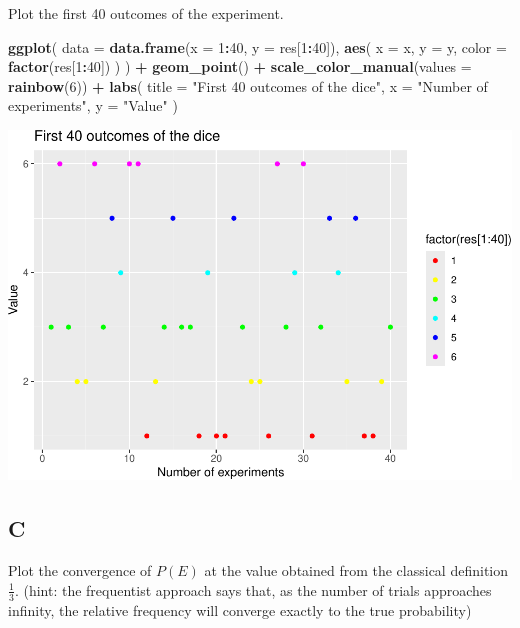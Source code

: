 \documentclass[
]{article}
\newenvironment{Shaded}{\begin{snugshade}}{\end{snugshade}}
\newcommand{\DataTypeTok}[1]{\textcolor[rgb]{0.13,0.29,0.53}{#1}}
\newcommand{\DecValTok}[1]{\textcolor[rgb]{0.00,0.00,0.81}{#1}}
\newcommand{\KeywordTok}[1]{\textcolor[rgb]{0.13,0.29,0.53}{\textbf{#1}}}
\newcommand{\NormalTok}[1]{#1}
\newcommand{\OperatorTok}[1]{\textcolor[rgb]{0.81,0.36,0.00}{\textbf{#1}}}
\newcommand{\StringTok}[1]{\textcolor[rgb]{0.31,0.60,0.02}{#1}}
\begin{document}
Plot the first 40 outcomes of the experiment.

\begin{Shaded}
\begin{Highlighting}[]
\KeywordTok{ggplot}\NormalTok{(}
  \DataTypeTok{data =} \KeywordTok{data.frame}\NormalTok{(}\DataTypeTok{x =} \DecValTok{1}\OperatorTok{:}\DecValTok{40}\NormalTok{, }\DataTypeTok{y =}\NormalTok{ res[}\DecValTok{1}\OperatorTok{:}\DecValTok{40}\NormalTok{]),}
  \KeywordTok{aes}\NormalTok{(}
    \DataTypeTok{x =}\NormalTok{ x,}
    \DataTypeTok{y =}\NormalTok{ y,}
    \DataTypeTok{color =} \KeywordTok{factor}\NormalTok{(res[}\DecValTok{1}\OperatorTok{:}\DecValTok{40}\NormalTok{])}
\NormalTok{  )}
\NormalTok{) }\OperatorTok{+}
\StringTok{  }\KeywordTok{geom\_point}\NormalTok{() }\OperatorTok{+}
\StringTok{  }\KeywordTok{scale\_color\_manual}\NormalTok{(}\DataTypeTok{values =} \KeywordTok{rainbow}\NormalTok{(}\DecValTok{6}\NormalTok{)) }\OperatorTok{+}
\StringTok{  }\KeywordTok{labs}\NormalTok{(}
    \DataTypeTok{title =} \StringTok{"First 40 outcomes of the dice"}\NormalTok{,}
    \DataTypeTok{x =} \StringTok{"Number of experiments"}\NormalTok{, }\DataTypeTok{y =} \StringTok{"Value"}
\NormalTok{  )}
\end{Highlighting}
\end{Shaded}

\includegraphics{es_files/figure-latex/unnamed-chunk-5-1.pdf}

\hypertarget{c-1}{%
\subsection{C}\label{c-1}}

Plot the convergence of \(P(E)\) at the value obtained from the
classical definition \(\frac{1}{3}\). (hint: the frequentist approach
says that, as the number of trials approaches infinity, the relative
frequency will converge exactly to the true probability)
\end{document}
